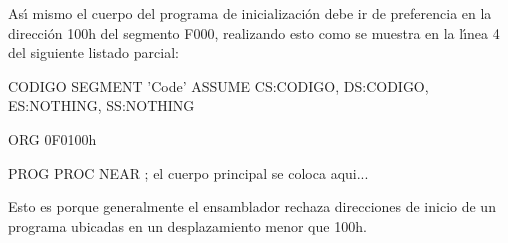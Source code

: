 As\'{\i} mismo el cuerpo del programa de inicializaci\'on debe ir de preferencia en la %
direcci\'on 100h del segmento F000, realizando esto como se muestra en la l\'{\i}nea 4 del %
siguiente listado parcial:

\begin{listing}{1}
CODIGO SEGMENT 'Code'
   ASSUME CS:CODIGO, DS:CODIGO, ES:NOTHING, SS:NOTHING

   ORG 0F0100h

PROG PROC NEAR  
; el cuerpo principal se coloca aqui...
\end{listing}

Esto es porque generalmente el ensamblador rechaza direcciones de inicio de un programa ubicadas %
en un desplazamiento menor que 100h.


